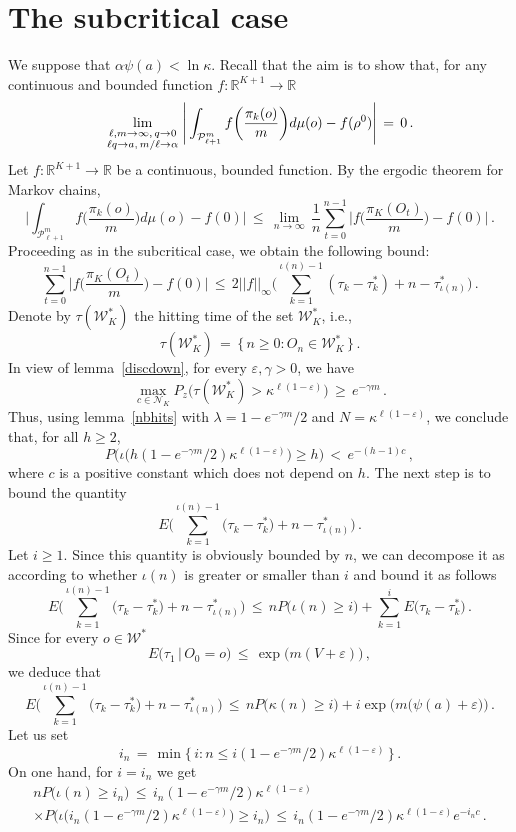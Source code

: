 \documentclass[a4paper,12pt]{article}
\theoremstyle{definition}
\theoremstyle{remark}
\def \cN {\mathcal{N}}
\def \cP {\mathcal{P}}
\def \cW {\mathcal{W}}
\def \a {\alpha}
\def \g {\gamma}
\def \e {\varepsilon}
\def \k {\kappa}
\def \l {\lambda}
\def \R {\mathbb{R}}
\def \lra {\longrightarrow}
\def \pml {\cP^m_{\ell +1}}
\def \cW {{\mathcal W}^*}
\def\lmq {{\genfrac{}{}{0pt}{1}{\ell,m\to\infty,\,q\to0}{\ell q\to a,\,m/\ell\to\a}}}
\begin{document}
\section{The subcritical case}\label{sub}
We suppose that $\a\psi(a)<\ln\k$.
Recall that the aim is to show that, for any 
continuous and bounded function $f:\R^{K+1}\lra\R$
$$\lim_\lmq\Bigg|\int_{\pml}f\bigg(
\frac{\pi_k(o)}{m}
\bigg)d\mu(o)-f(\rho^0)\Bigg|
\,=\,0\,.$$
Let $f:\R^{K+1}\lra\R$ be a continuous, bounded function.
By the ergodic theorem for Markov chains,
$$
\Bigg|\int_{\pml}f\bigg(
\frac{\pi_k(o)}{m}
\bigg)d\mu(o)-f(0)\Bigg|
\,\leq\,
\lim_{n\to\infty}\,
\frac{1}{n}\sum_{t=0}^{n-1}
\Bigg|
f\bigg(
\frac{\pi_K(O_t)}{m}
\bigg)-f(0)
\Bigg|\,.
$$
Proceeding as in the subcritical case,
we obtain the following bound:
$$
\sum_{t=0}^{n-1}
\Bigg|
f\bigg(
\frac{\pi_K(O_t)}{m}
\bigg)-f(0)
\Bigg|\,\leq\,2||f||_\infty\bigg(\sum_{k= 1}^{\iota(n)-1}(
\tau_k-\tau_k^*)+n-\tau^*_{\iota(n)}\bigg)
\,.
$$
Denote by $\tau(\cW_K)$ the hitting time of the set $\cW_K$, i.e.,
$$\tau(\cW_K)\,=\,\big\lbrace\,
n\geq0: O_n\in\cW_K
\,\big\rbrace\,.$$
In view of lemma~\ref{discdown}, for every $\e,\g>0$, we have
$$\max_{c\in\cN_K}P_z\big(
\tau(\cW_K)>\k^{\ell(1-\e)}
\big)\,\geq\,e^{-\g m}\,.$$
Thus, using lemma~\ref{nbhits} with $\l=1-e^{-\g m}/2$ and $N=\k^{\ell(1-\e)}$,
we conclude that, for all $h\geq 2$,
$$P\Big(
\iota\big(
h(1-e^{-\g m}/2)\k^{\ell(1-\e)}
\big)\geq h
\big)\,<\,e^{-(h-1)c}\,,$$
where $c$ is a positive constant which does not depend on $h$.
The next step is to bound the quantity
$$
E\Bigg(
\sum_{k=1}^{\iota(n)-1}\big(
\tau_k-\tau_k^*
\big)
+n-\tau_{\iota(n)}^*
\Bigg)\,.
$$
Let $i\geq 1$.
Since this quantity is obviously bounded by $n$,
we can decompose it as according to whether $\iota(n)$
is greater or smaller than $i$ and bound it as follows
$$E\Bigg(
\sum_{k=1}^{\iota(n)-1}\big(
\tau_k-\tau_k^*
\big)
+n-\tau_{\iota(n)}^*
\Bigg)\,\leq\,
nP\big(
\iota(n)\geq i
\big)+
\sum_{k=1}^{i}E\big(
\tau_k-\tau_k^*
\big)\,.$$
Since for every $o\in\cW$
$$E\big(\tau_1\,\big|\,O_0=o\big)\,\leq\,
\exp\big(
m(V+\e)
\big)\,,$$
we deduce that
$$E\Bigg(
\sum_{k=1}^{\iota(n)-1}\big(
\tau_k-\tau_k^*
\big)
+n-\tau_{\iota(n)}^*
\Bigg)\,\leq\,
nP\big(
\kappa(n)\geq i
\big)+
i\exp\Big(
m\big(
\psi(a)+\e
\big)
\Big)\,.$$
Let us set 
$$i_n\,=\,\min\big\lbrace\,
i:n\leq i (1-e^{-\g m}/2)\k^{\ell(1-\e)}
\,\big\rbrace\,.$$
On one hand, for $i=i_n$ we get
\begin{multline*}
nP\big(
\iota(n)\geq i_n
\big)\,\leq\,
i_n (1-e^{-\g m}/2)\k^{\ell(1-\e)}\\
\times P\Big(
\iota\big(i_n(1-e^{-\g m}/2)\k^{\ell(1-\e)}\big)\geq i_n
\Big)\,\leq\,
i_n (1-e^{-\g m}/2)\k^{\ell(1-\e)}e^{-i_n c}\,.
\end{multline*}
\end{document}
